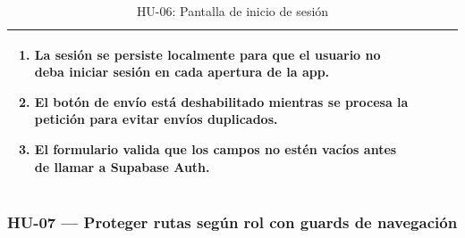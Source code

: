 \begin{table}[H]
\begin{tabularx}{\textwidth}{|>{\bfseries}p{3.5cm}|X|>{\bfseries}p{3.5cm}|X|}
{\begin{enumerate}[leftmargin=1.5em, itemsep=0pt, parsep=2pt, topsep=0pt]
    \item La sesión se persiste localmente para que el usuario no deba iniciar sesión en cada apertura de la app.
    \item El botón de envío está deshabilitado mientras se procesa la petición para evitar envíos duplicados.
    \item El formulario valida que los campos no estén vacíos antes de llamar a Supabase Auth.
  \end{enumerate}
} \\
\hline
\end{tabularx}
\caption{HU-06: Pantalla de inicio de sesión}
\end{table}

\subsubsection*{HU-07 — Proteger rutas según rol con guards de navegación}
